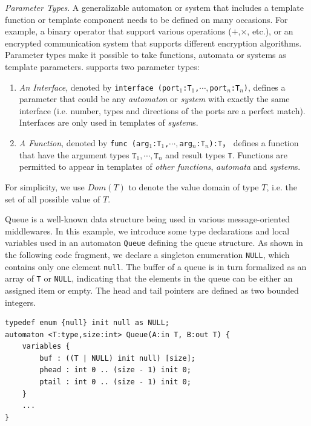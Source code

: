 \noindent\emph{Parameter Types}. A generalizable automaton or system that includes a template function or template component needs to be defined on many occasions. For example, a binary operator that support various operations ($+$,$\times$, etc.), or an encrypted communication system that supports different encryption algorithms. Parameter types make it possible to take functions, automata or systems as template parameters. \lang{} supports two parameter types: 
\begin{enumerate}
    \item \emph{An Interface}, denoted by \texttt{interface (port$_1$:T$_1$,$\cdots,$port$_n$:T$_n$)}, defines a parameter that could be any \emph{automaton} or \emph{system} with exactly the same interface (i.e. number, types and directions of the ports are a perfect match). Interfaces are only used in templates of \emph{system}s.
    \item \emph{A Function}, denoted by \texttt{func (arg$_1$:T$_1$,$\cdots, $arg$_n$:T$_n$):T}， defines a function that have the argument types $\texttt{T}_1,\cdots,\texttt{T}_n$ and result types \texttt{T}. Functions are permitted to appear in templates of \emph{other functions}, \emph{automata} and \emph{system}s.
\end{enumerate}

For simplicity, we use $Dom(T)$ to denote the value domain of type $T$, i.e. the set of all possible value of $T$.

\begin{example} Queue is a well-known data structure being used in various message-oriented middlewares. In this example, we introduce some type declarations and local variables used in an automaton \texttt{Queue} defining the queue structure. As shown in the following code fragment, we declare a singleton enumeration \texttt{NULL}, which contains only one element \texttt{null}. The buffer of a queue is in turn formalized as an array of \texttt{T} or \texttt{NULL}, indicating that the elements in the queue can be either an assigned item or empty. The head and tail pointers are defined as two bounded integers.
\begin{lstlisting}
typedef enum {null} init null as NULL;
automaton <T:type,size:int> Queue(A:in T, B:out T) {
    variables {
        buf : ((T | NULL) init null) [size];
        phead : int 0 .. (size - 1) init 0;
        ptail : int 0 .. (size - 1) init 0;
    }
    ...
}
\end{lstlisting}
\label{exp:typeinqueue}
\end{example}

